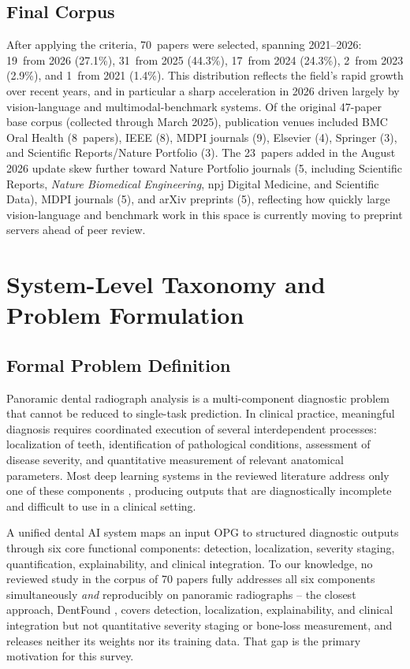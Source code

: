 \documentclass[conference]{IEEEtran}
\begin{document}
\subsection{Final Corpus}

After applying the criteria, 70~papers were selected, spanning
2021--2026: 19~from 2026 (27.1\%), 31~from 2025 (44.3\%), 17~from 2024
(24.3\%), 2~from 2023 (2.9\%), and 1~from 2021 (1.4\%). This
distribution reflects the field's rapid growth over recent years, and
in particular a sharp acceleration in 2026 driven largely by
vision-language and multimodal-benchmark systems. Of the original
47-paper base corpus (collected through March 2025), publication
venues included BMC Oral Health (8~papers), IEEE (8), MDPI journals
(9), Elsevier (4), Springer (3), and Scientific Reports/Nature
Portfolio (3). The 23~papers added in the August 2026 update skew
further toward Nature Portfolio journals (5, including Scientific
Reports, \emph{Nature Biomedical Engineering}, npj Digital Medicine,
and Scientific Data), MDPI journals (5), and arXiv preprints (5),
reflecting how quickly large vision-language and benchmark work in
this space is currently moving to preprint servers ahead of peer
review.

\section{System-Level Taxonomy and Problem Formulation}
\label{sec:taxonomy}

\subsection{Formal Problem Definition}

Panoramic dental radiograph analysis is a multi-component diagnostic
problem that cannot be reduced to single-task prediction.
In clinical practice, meaningful diagnosis requires coordinated
execution of several interdependent processes: localization of teeth,
identification of pathological conditions, assessment of disease
severity, and quantitative measurement of relevant anatomical
parameters. Most deep learning systems in the reviewed
literature address only one of these components
\cite{albano2024artificial,luke2025accuracy,zanini2024systematic},
producing outputs that are diagnostically incomplete and difficult to
use in a clinical setting.

A unified dental AI system maps an input OPG to structured diagnostic
outputs through six core functional components: detection, localization,
severity staging, quantification, explainability, and clinical
integration. To our knowledge, no reviewed study in the
corpus of 70 papers fully addresses all six components simultaneously
\emph{and} reproducibly on panoramic radiographs -- the closest
approach, DentFound \cite{zhu2026dentfound}, covers detection,
localization, explainability, and clinical integration but not
quantitative severity staging or bone-loss measurement, and releases
neither its weights nor its training data. That gap is the primary
motivation for this survey.
\end{document}
